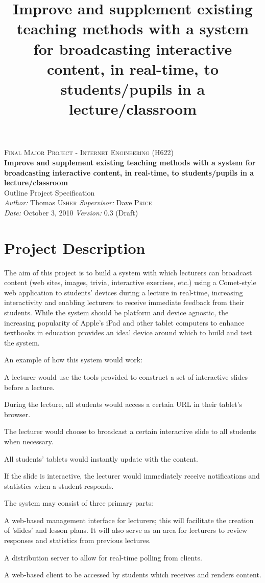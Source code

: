 \documentclass[a4papert,11pt,notitlepage]{ltxdoc}
\title{Improve and supplement existing teaching methods with a system for broadcasting interactive content, in real-time, to students/pupils in a lecture/classroom}
\begin{document}
\begin{center}
\textsc{\Large Final Major Project - Internet Engineering (H622)}\\[0.3cm]
{\Large \bfseries Improve and supplement existing teaching methods with a system for broadcasting interactive content, in real-time, to students/pupils in a lecture/classroom}\\[0.3cm]
{\Large Outline Project Specification}\\[0.3cm]
\emph{Author:} Thomas \textsc{Usher} \hspace{1cm} \emph{Supervisor:} Dave \textsc{Price}\\
\emph{Date:} October 3, 2010 \hspace{1cm} \emph{Version:} 0.3 (Draft)
\end{center}
\section{Project Description}
The aim of this project is to build a system with which lecturers can broadcast content (web sites, images, trivia, interactive exercises, etc.) using a Comet-style web application to students' devices during a lecture in real-time, increasing interactivity and enabling lecturers to receive immediate feedback from their students. While the system should be platform and device agnostic, the increasing popularity of Apple's iPad and other tablet computers to enhance textbooks in education provides an ideal device around which to build and test the system. 

An example of how this system would work:
\begin{enumerate*}
\item A lecturer would use the tools provided to construct a set of interactive slides before a lecture.
\item During the lecture, all students would access a certain URL in their tablet's browser.
\item The lecturer would choose to broadcast a certain interactive slide to all students when necessary.
\item All students' tablets would instantly update with the content.
\item If the slide is interactive, the lecturer would immediately receive notifications and statistics when a student responds.
\end{enumerate*}

The system may consist of three primary parts:
\begin{itemize*}
\item A web-based management interface for lecturers; this will facilitate the creation of 'slides' and lesson plans. It will also serve as an area for lecturers to review responses and statistics from previous lectures.
\item A distribution server to allow for real-time polling from clients.
\item A web-based client to be accessed by students which receives and renders content.
\end{itemize*}
\end{document}
